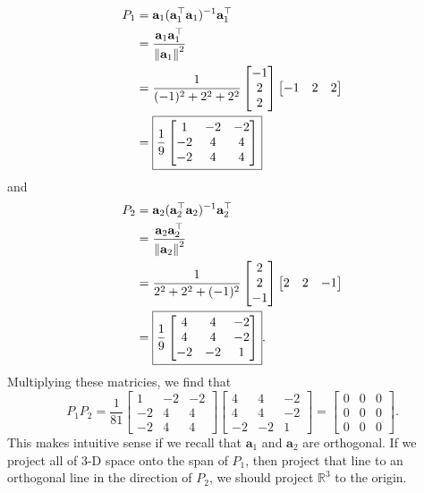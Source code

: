 \documentclass[11pt]{article}
\renewcommand{\vec}[1]{\mathbf{#1}}
\begin{document}
\begin{align*}
	P_{1} &= \vec{a}_{1} (\vec{a}_{1}^{\top}\vec{a}_{1})^{-1}\vec{a}_{1}^{\top} \\
	&= \frac{\vec{a}_{1}\vec{a}_{1}^{\top}}{\norm{\vec{a}_{1}}^{2}} \\
	&= \frac{1}{(-1)^{2} + 2^{2} + 2^{2}} \begin{bmatrix} -1 \\ 2 \\ 2 \end{bmatrix} \begin{bmatrix} -1 & 2 & 2 \end{bmatrix} \\
	&= \boxed{\frac{1}{9} \begin{bmatrix} 1 & -2 & -2 \\ -2 & 4 & 4 \\ -2 & 4 & 4 \end{bmatrix}}
\end{align*}
and
\begin{align*}
	P_{2} &= \vec{a}_{2} (\vec{a}_{2}^{\top}\vec{a}_{2})^{-1}\vec{a}_{2}^{\top} \\
	&= \frac{\vec{a}_{2}\vec{a}_{2}^{\top}}{\norm{\vec{a}_{2}}^{2}} \\
	&= \frac{1}{2^{2} + 2^{2} + (-1)^{2}} \begin{bmatrix} 2 \\ 2 \\ -1 \end{bmatrix} \begin{bmatrix} 2 & 2 & -1 \end{bmatrix} \\
	&= \boxed{\frac{1}{9} \begin{bmatrix} 4 & 4 & -2 \\ 4 & 4 & -2 \\ -2 & -2 & 1 \end{bmatrix}}.
\end{align*}
Multiplying these matricies, we find that
\[
	P_{1}P_{2} = \frac{1}{81} \begin{bmatrix} 1 & -2 & -2 \\ -2 & 4 & 4 \\ -2 & 4 & 4 \end{bmatrix} \begin{bmatrix} 4 & 4 & -2 \\ 4 & 4 & -2 \\ -2 & -2 & 1 \end{bmatrix} = \boxed{\begin{bmatrix} 0 & 0 & 0 \\ 0 & 0 & 0 \\ 0 & 0 & 0 \end{bmatrix}}.
\]
This makes intuitive sense if we recall that $\vec{a}_{1}$ and $\vec{a}_{2}$ are orthogonal. If we project all of 3-D space onto the span of $P_{1}$, then project that line to an orthogonal line in the direction of $P_{2}$, we should project $\mathbb{R}^{3}$ to the origin. 
\end{document}

